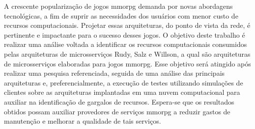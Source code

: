 A crescente popularização de jogos \acf{mmorpg} demanda por novas abordagens tecnológicas, a fim de suprir as necessidades dos usuários com menor custo de recursos computacionais.
%
Projetar essas arquiteturas, do ponto de vista da rede, é pertinente e impactante para o sucesso desses jogos.
%
O objetivo deste trabalho é realizar uma análise voltada a identificar os recursos computacionais consumidos pelas arquiteturas de microsserviços Rudy, Salz e Willson, a qual são arquiteturas de microsserviços elaboradas para jogos \ac{mmorpg}.
%
Esse objetivo será atingido após realizar uma pesquisa referenciada, seguida de uma análise das principais arquiteturas e, preferencialmente, a execução de testes utilizando simulações de clientes sobre as arquiteturas implantadas em uma nuvem computacional para auxiliar na identificação de gargalos de recursos. 
%
Espera-se que os resultados obtidos possam auxiliar provedores de serviços \ac{mmorpg} a reduzir gastos de manutenção e melhorar a qualidade de tais serviços. \\
